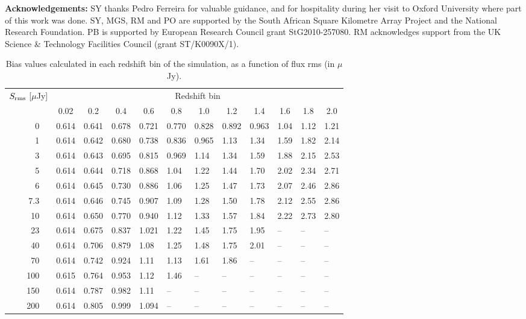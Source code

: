 \documentclass[useAMS,usenatbib]{mn2e}
\begin{document}
{\bf Acknowledgements:} SY thanks Pedro Ferreira for valuable guidance, and for hospitality during her visit to Oxford University where part of this work was done.
SY, MGS, RM and PO are supported by the South African Square Kilometre Array Project and  the National Research Foundation. PB is supported by European Research Council grant StG2010-257080. RM acknowledges support from the UK Science \& Technology Facilities Council (grant ST/K0090X/1).


\begin{table}
\begin{centering}
{\renewcommand{\arraystretch}{1.3}
\begin{tabular}{rlllllllllll}
\hline 
\multirow{2}{*}{$S_{\rm rms}$ [$\mu$Jy]} & \multicolumn{11}{c}{Redshift bin} \\
 & \multicolumn{1}{c}{0.02} & \multicolumn{1}{c}{0.2} & \multicolumn{1}{c}{ 0.4} & \multicolumn{1}{c}{0.6} &  \multicolumn{1}{c}{0.8} & \multicolumn{1}{c}{1.0}   & \multicolumn{1}{c}{1.2}
& \multicolumn{1}{c}{1.4} & \multicolumn{1}{c}{ 1.6}& \multicolumn{1}{c}{ 1.8} & \multicolumn{1}{c}{ 2.0}   \\ 
\hline
 0~~ &	0.614 &	0.641 	&	0.678	 &	0.721	&  0.770	& 0.828 & 0.892 &0.963 &	1.04 & 	1.12 &1.21 \\
 1~~ & 	0.614 & 0.642	&	0.680	 &	0.738	&	0.836	& 0.965 & 1.13	&	1.34	&  1.59	&  1.82 &  2.14 \\
 3~~ &	0.614 & 0.643	&	0.695	 & 0.815	& 0.969 	& 1.14 	& 	1.34 &	1.59 & 	1.88 &	 2.15 &  2.53 \\
 5~~ &	0.614 &	0.644	& 	0.718	 & 0.868	& 1.04		& 1.22	& 1.44	& 	1.70	& 	2.02	& 	2.34	& 	2.71 \\
 6~~	& 	0.614 &	0.645 	& 0.730 	 & 0.886 	& 1.06		& 1.25	& 1.47 	&  1.73	& 	2.07 &	2.46	& 	2.86 \\
 7.3~~ &0.614 & 0.646	& 0.745		 & 0.907 	& 1.09		& 1.28	& 1.50	& 1.78	& 	2.12	& 	2.55	& 	2.86 \\
 10~~ & 0.614 & 0.650	& 0.770		 & 0.940	& 1.12		& 1.33	& 1.57	& 1.84	& 2.22	& 2.73	& 2.80 \\
 23~~ & 0.614 & 0.675	& 0.837		 & 1.021	& 1.22		& 1.45	& 1.75	& 1.95  &  --		&	--		&	--		\\
 40~~ & 0.614 & 0.706	& 0.879		 & 1.08		& 1.25		& 1.48	& 1.75	& 2.01 	&	--		& 	--		&	--		\\
 70~~ &	0.614 & 0.742	& 0.924		& 1.11		& 1.13		& 1.61	& 1.86 	&	-- 		&	-- 		& 	--   	& 	--	 	 \\
 100~~ &0.615 & 0.764	& 0.953		& 1.12		& 1.46		& 	-- 		& 	--		& 	--		& 	--		&	--		&	--		\\
 150~~ & 0.614& 0.787	& 0.982		& 1.11		&	-- 			&	--		&	--		&	--		&	--		&	--		&	--		\\
 200~~ & 0.614& 0.805	& 0.999		& 1.094		&	--			&	--		&	--		&	--		&	--		&	--		&	--		\\
\hline
\end{tabular} }
\renewcommand\thetable{A1}
\caption{Bias values calculated in each redshift bin of the simulation, as a function of flux rms (in $\mu$Jy).}
\end{centering}
\label{tab:bias}
\end{table}


\balance


%
\end{document}
